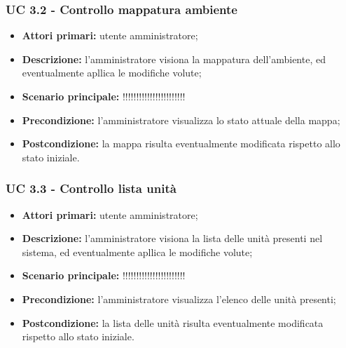 \subsubsection{UC 3.2 - Controllo mappatura ambiente}
	\begin{itemize}
		\item \textbf{Attori primari:} utente amministratore;
		\item \textbf{Descrizione:} l'amministratore visiona la mappatura dell'ambiente, ed eventualmente apllica le modifiche volute;
		\item \textbf{Scenario principale:} !!!!!!!!!!!!!!!!!!!!!!!
		\item \textbf{Precondizione:} l'amministratore visualizza lo stato attuale della mappa;
		\item \textbf{Postcondizione:} la mappa risulta eventualmente modificata rispetto allo stato iniziale.
	\end{itemize}

\subsubsection{UC 3.3 - Controllo lista unità}
	\begin{itemize}
		\item \textbf{Attori primari:} utente amministratore;
		\item \textbf{Descrizione:} l'amministratore visiona la lista delle unità presenti nel sistema, ed eventualmente apllica le modifiche volute;
		\item \textbf{Scenario principale:} !!!!!!!!!!!!!!!!!!!!!!!
		\item \textbf{Precondizione:} l'amministratore visualizza l'elenco delle unità presenti;
		\item \textbf{Postcondizione:} la lista delle unità risulta eventualmente modificata rispetto allo stato iniziale.
	\end{itemize}



